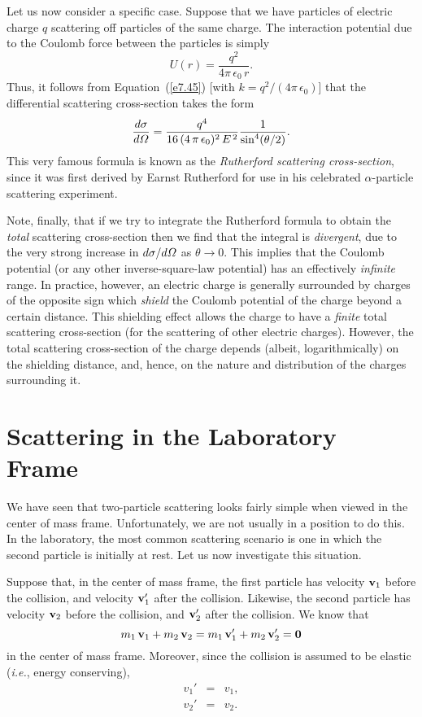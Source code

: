 Let us now consider a specific case. Suppose that we have particles
of electric charge $q$ scattering off  particles of the same charge. The
interaction potential due to the Coulomb force between the particles
is simply
\begin{equation}
U(r) = \frac{q^2}{4\pi\,\epsilon_0\,r}.
\end{equation}
Thus, it follows from Equation~(\ref{e7.45}) [with $k=q^2/(4\pi\,\epsilon_0)$]
that the differential scattering cross-section takes the form
\begin{equation}\label{ruthf}
\frac{d\sigma}{d{\mit\Omega}} = \frac{q^4}{16\,(4\,\pi\,\epsilon_0)^2\,E^{\,2}}\frac{1}{\sin^4(\theta/2)}.
\end{equation}
This very famous formula is known as the {\em Rutherford scattering cross-section}, since it was first derived by Earnst Rutherford for use in his
celebrated $\alpha$-particle scattering experiment.

Note, finally, that if we try to integrate the Rutherford formula to obtain
the {\em total}\/ scattering cross-section then we find that the integral is {\em divergent},
due to the very strong increase in $d\sigma/d{\mit\Omega}$ as $\theta\rightarrow 0$. This implies that the Coulomb potential (or any
other inverse-square-law potential)
 has an effectively {\em infinite}\/ range. In practice, however, an electric
charge  is generally surrounded by charges of the opposite sign which
{\em shield}\/ the Coulomb potential of the charge beyond a certain distance.
This shielding effect allows the charge to have a {\em finite}\/ total
scattering cross-section (for the scattering of other electric charges). However, the total scattering cross-section of the charge
depends (albeit, logarithmically) on the shielding distance, and, hence, on the
nature and distribution of the charges surrounding it.

\section{Scattering in the Laboratory Frame}
We have seen that two-particle scattering looks fairly simple when viewed in the
center of mass frame. Unfortunately, we are not usually in a position
to do this. In the laboratory, the most
common scattering scenario is one in which the second particle is
initially at rest. Let us now investigate this situation.

Suppose that, in the center of mass frame, the first particle has velocity
${\bf v}_1$ before the collision, and velocity ${\bf v}_1'$ after the
collision. Likewise, the second particle has velocity ${\bf v}_2$ before the
collision, and ${\bf v}_2'$ after the collision. We know that
\begin{equation}
m_1\,{\bf v}_1 + m_2\,{\bf v}_2 = m_1\,{\bf v}_1'+m_2\,{\bf v}_2' = {\bf 0}
\end{equation}
in the center of mass frame. Moreover, since the collision is assumed to be elastic ({\em i.e.}, energy conserving),
\begin{eqnarray}
v_1' &= &v_1,\\[0.5ex]
v_2' &=& v_2.
\end{eqnarray}

